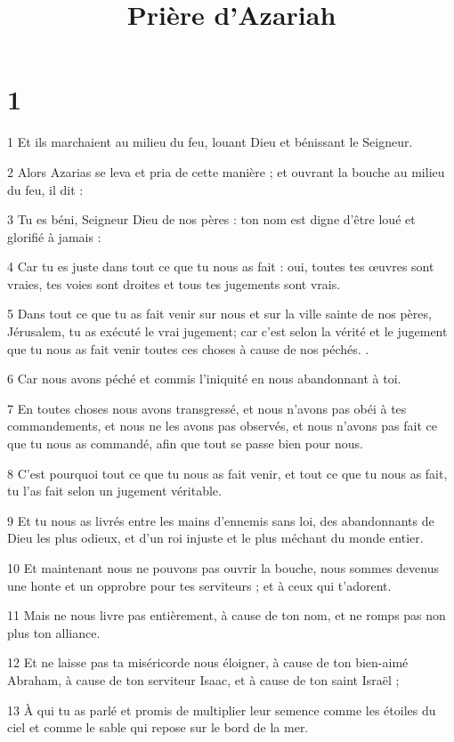 

\title{Prière d'Azariah}


\chapter{1}

\par 1 Et ils marchaient au milieu du feu, louant Dieu et bénissant le Seigneur.
\par 2 Alors Azarias se leva et pria de cette manière ; et ouvrant la bouche au milieu du feu, il dit :
\par 3 Tu es béni, Seigneur Dieu de nos pères : ton nom est digne d'être loué et glorifié à jamais :
\par 4 Car tu es juste dans tout ce que tu nous as fait : oui, toutes tes œuvres sont vraies, tes voies sont droites et tous tes jugements sont vrais.
\par 5 Dans tout ce que tu as fait venir sur nous et sur la ville sainte de nos pères, Jérusalem, tu as exécuté le vrai jugement; car c'est selon la vérité et le jugement que tu nous as fait venir toutes ces choses à cause de nos péchés. .
\par 6 Car nous avons péché et commis l'iniquité en nous abandonnant à toi.
\par 7 En toutes choses nous avons transgressé, et nous n'avons pas obéi à tes commandements, et nous ne les avons pas observés, et nous n'avons pas fait ce que tu nous as commandé, afin que tout se passe bien pour nous.
\par 8 C'est pourquoi tout ce que tu nous as fait venir, et tout ce que tu nous as fait, tu l'as fait selon un jugement véritable.
\par 9 Et tu nous as livrés entre les mains d'ennemis sans loi, des abandonnants de Dieu les plus odieux, et d'un roi injuste et le plus méchant du monde entier.
\par 10 Et maintenant nous ne pouvons pas ouvrir la bouche, nous sommes devenus une honte et un opprobre pour tes serviteurs ; et à ceux qui t'adorent.
\par 11 Mais ne nous livre pas entièrement, à cause de ton nom, et ne romps pas non plus ton alliance.
\par 12 Et ne laisse pas ta miséricorde nous éloigner, à cause de ton bien-aimé Abraham, à cause de ton serviteur Isaac, et à cause de ton saint Israël ;
\par 13 À qui tu as parlé et promis de multiplier leur semence comme les étoiles du ciel et comme le sable qui repose sur le bord de la mer.
